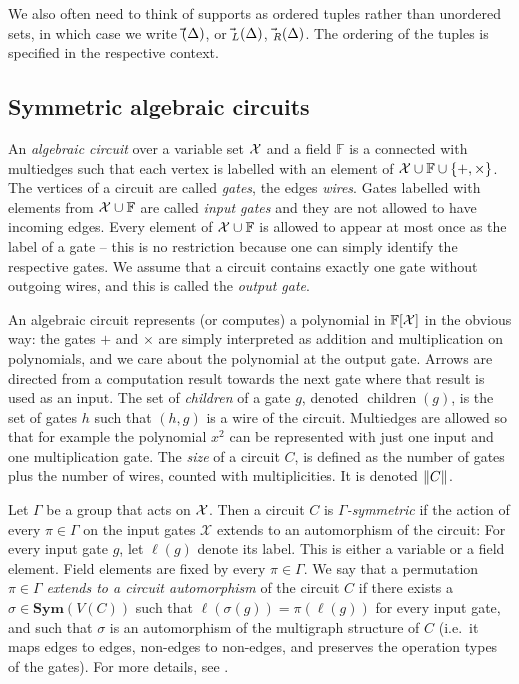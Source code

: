 \documentclass[11pt, DIV=15]{scrarticle}
\theoremstyle{definition}
\theoremstyle{plain}
\theoremstyle{remark}
\DeclarePairedDelimiter{\norm}{\lVert}{\rVert}
\newcommand{\Xx}{{\cal X}}
\newcommand{\Sym}{\mathbf{Sym}}
\DeclareMathOperator{\child}{children}
\newcommand{\bbF}{\mathbb{F}}
\let\sup\relax
\DeclareMathOperator{\sup}{sup}
\begin{document}
We also often need to think of supports as ordered tuples rather than unordered sets, in which case we write $\vec{\sup}(\Delta)$, or $\vec{\sup}_L(\Delta)$, $\vec{\sup}_R(\Delta)$. The ordering of the tuples is specified in the respective context.





\subsection{Symmetric algebraic circuits}

An \emph{algebraic circuit} over a variable set $\Xx$ and a field $\bbF$ is a connected  with multiedges
such that each vertex is labelled with an element of $\Xx \cup \bbF \cup \{+,\times\}$. 	The vertices of a circuit are called \emph{gates}, the edges \emph{wires}.
Gates labelled with elements from $\Xx \cup \bbF$ are called
\emph{input gates} and they are not allowed to have incoming
edges. Every element of $\Xx \cup \bbF$ is allowed to appear at most once as the label of a gate -- this is no restriction because one can simply identify the respective gates.  We assume that a circuit contains exactly one gate without outgoing wires, and this is called the \emph{output gate}.

An algebraic circuit represents (or computes) a polynomial in
$\bbF[\Xx]$ in the obvious way: the gates $+$ and $\times$
are simply interpreted as addition and multiplication on
polynomials, and we care about the polynomial at the output
gate. Arrows are directed from a computation result towards
the next gate where that result is used as an input. The set
of \emph{children} of a gate $g$, denoted $\child(g)$, is the
set of gates $h$ such that $(h,g)$ is a wire of the circuit.  
Multiedges are allowed so that for example the polynomial
$x^2$ can be represented with just one input and one
multiplication gate. The \emph{size} of a circuit $C$, is
defined as the number of gates plus the number of wires, counted with multiplicities. It is denoted $\norm{C}$.

Let $\Gamma$ be a group that acts on $\Xx$. Then a circuit $C$ is \emph{$\Gamma$-symmetric} if the action of every $\pi \in \Gamma$ on the input gates $\mathcal{X}$ extends to an automorphism of the circuit:
For every input gate $g$, let $\ell(g)$ denote its label. This is either a variable or a field element. 
Field elements are fixed by every $\pi \in \Gamma$.
We say that a permutation $\pi \in \Gamma$ \emph{extends to a circuit automorphism} of the  circuit $C$ 
if there exists a $\sigma \in \Sym(V(C))$ such that $\ell(\sigma(g)) = \pi(\ell(g))$ for every input gate, 
and such that $\sigma$ is an automorphism of the multigraph structure of $C$ (i.e.\ it maps edges to edges, non-edges to non-edges, and preserves the operation types of the gates). 
For more details, see \cite{dawar_symmetric_2025}. 
\end{document}
